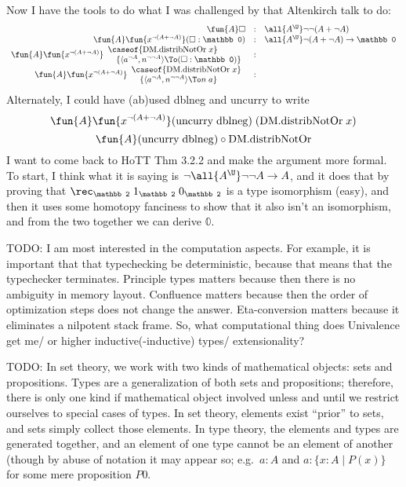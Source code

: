 \documentclass[11pt]{article} %
\theoremstyle{definition}
\theoremstyle{remark}
\begin{document}
Now I have the tools to do what I was challenged by that Altenkirch talk to do:
\[\begin{array}{rcl}
  \fun{A} \square & : & \all{A^\U}\lnot\lnot(A + \lnot A) \\
  \fun{A}\fun{x^{\lnot(A + \lnot A)}} (\square : \mathbb 0) & : & \all{A^\U}\lnot(A + \lnot A) \to \mathbb 0 \\
  \fun{A}\fun{x^{\lnot(A + \lnot A)}}
    \begin{array}{l}
      \caseof{\mathrm{DM.distribNotOr}\;x} \\
      \quad \{\langle a^{\lnot A}, n^{\lnot\lnot A}\rangle \To (\square : \mathbb 0)\}
    \end{array} & : & \\
  \fun{A}\fun{x^{\lnot(A + \lnot A)}}
    \begin{array}{l}
      \caseof{\mathrm{DM.distribNotOr}\;x} \\
      \quad \{\langle a^{\lnot A}, n^{\lnot\lnot A}\rangle \To n\;a\}
    \end{array} & : &  \\
\end{array}\]
Alternately, I could have (ab)used dblneg and uncurry to write
  $$\fun{A}\fun{x^{\lnot(A + \lnot A)}} (\mathrm{uncurry}\; \mathrm{dblneg})\;(\mathrm{DM.distribNotOr}\;x)$$
  $$\fun{A}(\mathrm{uncurry}\; \mathrm{dblneg}) \circ \mathrm{DM.distribNotOr}$$
I want to come back to HoTT Thm 3.2.2 and make the argument more formal.
To start, I think what it is saying is $\lnot\all{A^\U}\lnot\lnot A \to A$, and it does that by proving that
   $\rec_\mathbb 2\;1_\mathbb2\;0_\mathbb2$ is a type isomorphism (easy), and then it uses some homotopy fanciness to show that it also isn't an isomorphism,
   and from the two together we can derive $\mathbb0$.

TODO:
I am most interested in the computation aspects.
For example, it is important that that typechecking be deterministic, because that means that the typechecker terminates.
Principle types matters because then there is no ambiguity in memory layout.
Confluence matters because then the order of optimization steps does not change the answer.
Eta-conversion matters because it eliminates a nilpotent stack frame.
So, what computational thing does Univalence get me\qcomma/ or higher inductive(-inductive) types\qcomma/ extensionality?

TODO:
In set theory, we work with two kinds of mathematical objects: sets and propositions.
Types are a generalization of both sets and propositions; therefore, there is only one kind if mathematical object involved unless and until we restrict ourselves to special cases of types.
In set theory, elements exist ``prior'' to sets, and sets simply collect those elements.
In type theory, the elements and types are generated together, and an element of one type cannot be an element of another (though by abuse of notation it may appear so; e.g.\ $a : A$ and $a : \{x : A \mid P(x)\}$ for some mere proposition $P$0.
\end{document}
